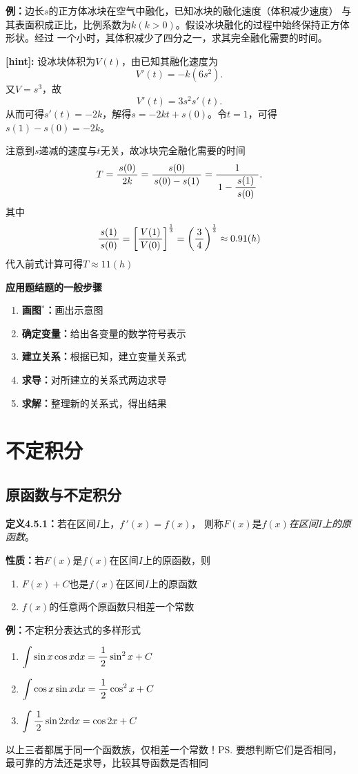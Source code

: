 {\bf 例：}边长$s$的正方体冰块在空气中融化，已知冰块的融化速度（体积减少速度）
与其表面积成正比，比例系数为$k(k>0)$。假设冰块融化的过程中始终保持正方体形状。经过
一个小时，其体积减少了四分之一，求其完全融化需要的时间。

{\bf [hint]:} 设冰块体积为$V(t)$，由已知其融化速度为
$$V'(t)=-k(6s^2).$$
又$V=s^3$，故
$$V'(t)=3s^2s'(t).$$
从而可得$s'(t)=-2k$，解得$s=-2kt+s(0)$。令$t=1$，可得$s(1)-s(0)=-2k$。

注意到$s$递减的速度与$t$无关，故冰块完全融化需要的时间
$$T=\displaystyle\frac{\,{s(0)}\,}{\,{2k}\,}=\displaystyle\frac{\,{s(0)}\,}{\,{s(0)-s(1)}\,}=\displaystyle\frac{\,{1}\,}{\,{1-\displaystyle\frac{\,{s(1)}\,}{\,{s(0)}\,}}\,}.$$
其中
$$\displaystyle\frac{\,{s(1)}\,}{\,{s(0)}\,}=\left[\displaystyle\frac{\,{V(1)}\,}{\,{V(0)}\,}\right]^{\frac13}=
\left(\displaystyle\frac{\,{3}\,}{\,{4}\,}\right)^{\frac13}\approx0.91(h)$$
代入前式计算可得$T\approx11(h)$

\begin{shaded}
{\bf 应用题结题的一般步骤}
\begin{enumerate}
  \setlength{\itemindent}{1cm}
  \item {{\bf 画图$^*$：}}画出示意图
  \item {{\bf 确定变量：}}给出各变量的数学符号表示
  \item {{\bf 建立关系：}}根据已知，建立变量关系式
  \item {{\bf 求导：}}对所建立的关系式两边求导
  \item {{\bf 求解：}}整理新的关系式，得出结果
\end{enumerate}
\end{shaded}

\section{不定积分}

\subsection{原函数与不定积分}

{\bf 定义4.5.1：}若在区间$I$上，$f\,'(x)=f(x)$，
则称$F(x)$是{\it $f(x)$在区间$I$上的原函数}。

{\bf 性质：}若$F(x)$是$f(x)$在区间$I$上的原函数，则
\begin{enumerate}
  \setlength{\itemindent}{1cm}
  \item $F(x)+C$也是$f(x)$在区间$I$上的原函数
  \item $f(x)$的任意两个原函数只相差一个常数
\end{enumerate}

{\bf 例：}不定积分表达式的多样形式
\begin{enumerate}[(1)]
  \setlength{\itemindent}{1cm}
  \item $\displaystyle\int\sin x\cos x\mathrm{d} x=\displaystyle\frac{\,{1}\,}{\,{2}\,}\sin^2x+C$
  \item $\displaystyle\int\cos x\sin x\mathrm{d} x=\displaystyle\frac{\,{1}\,}{\,{2}\,}\cos^2x+C$
  \item $\displaystyle\int\displaystyle\frac{\,{1}\,}{\,{2}\,}\sin2x\mathrm{d} x=\cos2x+C$
\end{enumerate}
以上三者都属于同一个函数族，仅相差一个常数！\ps{要想判断它们是否相同，
最可靠的方法还是求导，比较其导函数是否相同}

